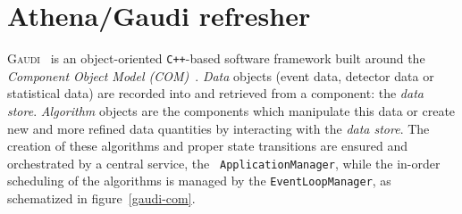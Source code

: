 \documentclass[a4paper]{jpconf}
\newcommand{\gaudi}{\textsc{Gaudi}}
\begin{document}
\section{{\sc Athena/Gaudi} refresher}
\gaudi~\cite{ref-gaudi} is an object-oriented {\tt C++}-based software
framework built around the \emph{Component Object Model
  (COM)}~\cite{ref-com}.
\emph{Data} objects (event data, detector data or statistical data)
are recorded into and retrieved from a component: the \emph{data
  store}.
\emph{Algorithm} objects are the components which manipulate this data or
create new and more refined data quantities by interacting with the
\emph{data store}.
The creation of these algorithms and proper state transitions are
ensured and orchestrated by a central service, the {\tt
  ApplicationManager}, while the in-order scheduling of the algorithms
is managed by the {\tt EventLoopManager}, as schematized in figure~\ref{gaudi-com}.
\end{document}
